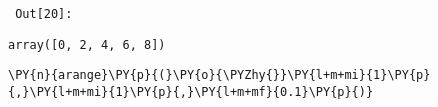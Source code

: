         {\par%
        \vspace{-1\smallerfontscale}%
        \noindent%
        \begin{minipage}{\cellleftmargin}%
    \hfill%
    {\smaller%
    \tt%
    \color{nbframe-out-prompt}%
    Out[20]:}%
    \hspace{\inputpadding}%
    \hspace{0em}%
    \hspace{3pt}%
    \end{minipage}%
        }%
    \begin{addmargin}[\cellleftmargin]{0em}%
    {\smaller%
    \vspace{-1\smallerfontscale}%
    
    
    
    \begin{verbatim}
array([0, 2, 4, 6, 8])
    \end{verbatim}

    
}%
    \end{addmargin}%

{\par%
\vspace{-1\baselineskip}%
}%
\begin{notebookcell}[21]%
\begin{addmargin}[\cellleftmargin]{0em}%
{\smaller%
\par%
%
\vspace{-1\smallerfontscale}%
\begin{Verbatim}[commandchars=\\\{\}]
\PY{n}{arange}\PY{p}{(}\PY{o}{\PYZhy{}}\PY{l+m+mi}{1}\PY{p}{,}\PY{l+m+mi}{1}\PY{p}{,}\PY{l+m+mf}{0.1}\PY{p}{)}
\end{Verbatim}
%
\par%
\vspace{-1\smallerfontscale}}%
\end{addmargin}
\end{notebookcell}

\par\vspace{1\smallerfontscale}%
    

